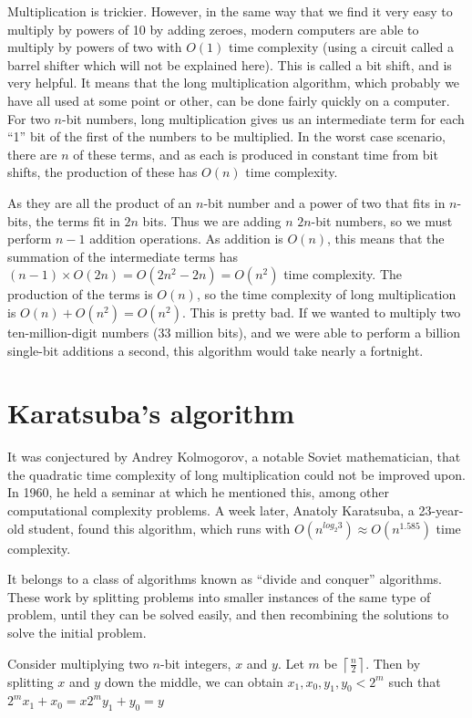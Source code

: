 \documentclass{article}
\begin{document}
Multiplication is trickier. However, in the same way that we find it very easy to multiply by powers of 10 by adding zeroes, modern computers are able to multiply by powers of two with \(O(1)\) time complexity (using a circuit called a barrel shifter which will not be explained here). This is called a bit shift, and is very helpful. It means that the long multiplication algorithm, which probably we have all used at some point or other, can be done fairly quickly on a computer. For two \(n\)-bit numbers, long multiplication gives us an intermediate term for each ``1'' bit of the first of the numbers to be multiplied. In the worst case scenario, there are \(n\) of these terms, and as each is produced in constant time from bit shifts, the production of these has \(O(n)\) time complexity.

As they are all the product of an \(n\)-bit number and a power of two that fits in \(n\)-bits, the terms fit in \(2n\) bits. Thus we are adding \(n\) \(2n\)-bit numbers, so we must perform \(n-1\) addition operations. As addition is \(O(n)\), this means that the summation of the intermediate terms has \((n-1)\times{}O(2n)=O(2n^2-2n)=O(n^2)\) time complexity. The production of the terms is \(O(n)\), so the time complexity of long multiplication is \(O(n)+O(n^2)=O(n^2)\). This is pretty bad. If we wanted to multiply two ten-million-digit numbers (33 million bits), and we were able to perform a billion single-bit additions a second, this algorithm would take nearly a fortnight.

\section{Karatsuba's algorithm}

It was conjectured by Andrey Kolmogorov, a notable Soviet mathematician, that the quadratic time complexity of long multiplication could not be improved upon. In 1960, he held a seminar at which he mentioned this, among other computational complexity problems. A week later, Anatoly Karatsuba, a 23-year-old student, found this algorithm, which runs with \(O(n^{log_{2}3})\approx{}O(n^{1.585})\) time complexity.

It belongs to a class of algorithms known as ``divide and conquer'' algorithms. These work by splitting problems into smaller instances of the same type of problem, until they can be solved easily, and then recombining the solutions to solve the initial problem.

Consider multiplying two \(n\)-bit integers, \(x\) and \(y\). Let \(m\) be \(\left\lceil\frac{n}{2}\right\rceil\). Then by splitting \(x\) and \(y\) down the middle, we can obtain \(x_1,x_0,y_1,y_0<2^m\) such that \(2^{m}x_1+x_0=x\)\(2^{m}y_1+y_0=y\)
\end{document}
